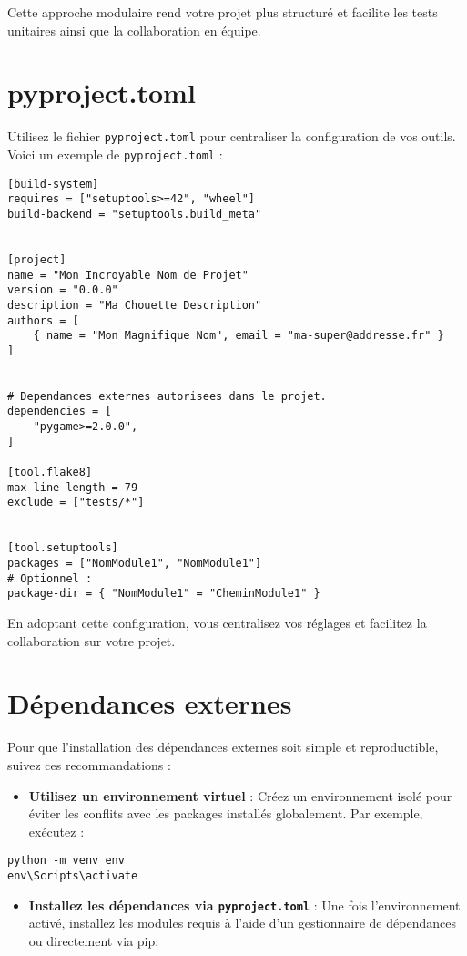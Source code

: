 \documentclass[a4paper,12pt]{article}
\begin{document}
Cette approche modulaire rend votre projet plus structuré et facilite les tests unitaires ainsi que la collaboration en équipe.
\section{pyproject.toml}

Utilisez le fichier \texttt{pyproject.toml} pour centraliser la configuration de vos outils. Voici un exemple de \texttt{pyproject.toml} :

\begin{lstlisting}
[build-system]
requires = ["setuptools>=42", "wheel"]
build-backend = "setuptools.build_meta"


[project]
name = "Mon Incroyable Nom de Projet"
version = "0.0.0"
description = "Ma Chouette Description"
authors = [
    { name = "Mon Magnifique Nom", email = "ma-super@addresse.fr" }
]


# Dependances externes autorisees dans le projet.
dependencies = [
    "pygame>=2.0.0",
]

[tool.flake8]
max-line-length = 79
exclude = ["tests/*"]


[tool.setuptools]
packages = ["NomModule1", "NomModule1"]
# Optionnel : 
package-dir = { "NomModule1" = "CheminModule1" }
\end{lstlisting}

En adoptant cette configuration, vous centralisez vos réglages et facilitez la collaboration sur votre projet.


\section{Dépendances externes}

Pour que l'installation des dépendances externes soit simple et reproductible, suivez ces recommandations :

\begin{itemize}
    \item \textbf{Utilisez un environnement virtuel} : Créez un environnement isolé pour éviter les conflits avec les packages installés globalement. Par exemple, exécutez :
\end{itemize}

\begin{lstlisting}
python -m venv env
env\Scripts\activate
\end{lstlisting}

\begin{itemize}
    \item \textbf{Installez les dépendances via \texttt{pyproject.toml}} : Une fois l'environnement activé, installez les modules requis à l'aide d'un gestionnaire de dépendances ou directement via pip.
\end{itemize}
\end{document}
